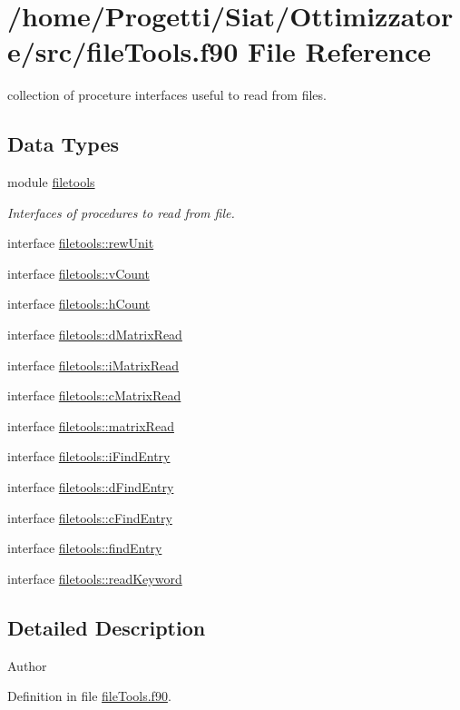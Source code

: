 \hypertarget{file_tools_8f90}{\section{/home/\-Progetti/\-Siat/\-Ottimizzatore/src/file\-Tools.f90 File Reference}
\label{file_tools_8f90}
}


collection of proceture interfaces useful to read from files.  


\subsection*{Data Types}
\begin{DoxyCompactItemize}
\item 
module \hyperlink{classfiletools}{filetools}
\begin{DoxyCompactList}\small\item\em Interfaces of procedures to read from file. \end{DoxyCompactList}\item 
interface \hyperlink{interfacefiletools_1_1rew_unit}{filetools\-::rew\-Unit}
\item 
interface \hyperlink{interfacefiletools_1_1v_count}{filetools\-::v\-Count}
\item 
interface \hyperlink{interfacefiletools_1_1h_count}{filetools\-::h\-Count}
\item 
interface \hyperlink{interfacefiletools_1_1d_matrix_read}{filetools\-::d\-Matrix\-Read}
\item 
interface \hyperlink{interfacefiletools_1_1i_matrix_read}{filetools\-::i\-Matrix\-Read}
\item 
interface \hyperlink{interfacefiletools_1_1c_matrix_read}{filetools\-::c\-Matrix\-Read}
\item 
interface \hyperlink{interfacefiletools_1_1matrix_read}{filetools\-::matrix\-Read}
\item 
interface \hyperlink{interfacefiletools_1_1i_find_entry}{filetools\-::i\-Find\-Entry}
\item 
interface \hyperlink{interfacefiletools_1_1d_find_entry}{filetools\-::d\-Find\-Entry}
\item 
interface \hyperlink{interfacefiletools_1_1c_find_entry}{filetools\-::c\-Find\-Entry}
\item 
interface \hyperlink{interfacefiletools_1_1find_entry}{filetools\-::find\-Entry}
\item 
interface \hyperlink{interfacefiletools_1_1read_keyword}{filetools\-::read\-Keyword}
\end{DoxyCompactItemize}


\subsection{Detailed Description}
\begin{DoxyAuthor}{Author}

\end{DoxyAuthor}


Definition in file \hyperlink{file_tools_8f90_source}{file\-Tools.\-f90}.

